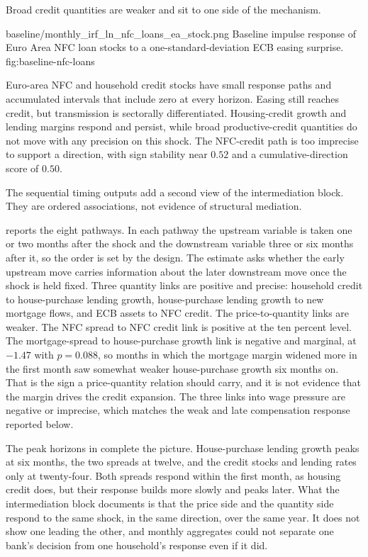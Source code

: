 Broad credit quantities are weaker and sit to one side of the mechanism.

\thesisfigure
  {baseline/monthly_irf_ln_nfc_loans_ea_stock.png}
  {Baseline impulse response of Euro Area NFC loan stocks to a one-standard-deviation ECB easing surprise.}
  {fig:baseline-nfc-loans}

Euro-area NFC and household credit stocks have small response paths and accumulated intervals that include zero at every horizon. Easing still reaches credit, but transmission is sectorally differentiated. Housing-credit growth and lending margins respond and persist, while broad productive-credit quantities do not move with any precision on this shock. The NFC-credit path is too imprecise to support a direction, with sign stability near \(0.52\) and a cumulative-direction score of \(0.50\).

The sequential timing outputs add a second view of the intermediation block. They are ordered associations, not evidence of structural mediation.



 reports the eight pathways. In each pathway the upstream variable is taken one or two months after the shock and the downstream variable three or six months after it, so the order is set by the design. The estimate asks whether the early upstream move carries information about the later downstream move once the shock is held fixed. Three quantity links are positive and precise: household credit to house-purchase lending growth, house-purchase lending growth to new mortgage flows, and ECB assets to NFC credit. The price-to-quantity links are weaker. The NFC spread to NFC credit link is positive at the ten percent level. The mortgage-spread to house-purchase growth link is negative and marginal, at \(-1.47\) with \(p=0.088\), so months in which the mortgage margin widened more in the first month saw somewhat weaker house-purchase growth six months on. That is the sign a price-quantity relation should carry, and it is not evidence that the margin drives the credit expansion. The three links into wage pressure are negative or imprecise, which matches the weak and late compensation response reported below.

The peak horizons in  complete the picture. House-purchase lending growth peaks at six months, the two spreads at twelve, and the credit stocks and lending rates only at twenty-four. Both spreads respond within the first month, as housing credit does, but their response builds more slowly and peaks later. What the intermediation block documents is that the price side and the quantity side respond to the same shock, in the same direction, over the same year. It does not show one leading the other, and monthly aggregates could not separate one bank's decision from one household's response even if it did.

